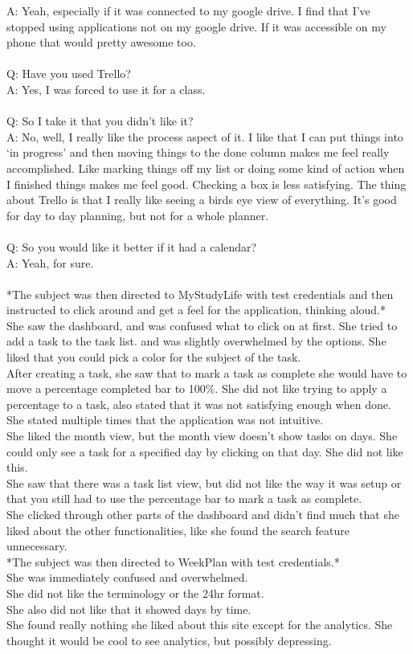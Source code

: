 A: Yeah, especially if it was connected to my google drive. I find that I’ve stopped using applications not on my google drive. If it was accessible on my phone that would pretty awesome too.\\ \\
Q: Have you used Trello? \\
A: Yes, I was forced to use it for a class.\\ \\
Q: So I take it that you didn't like it? \\
A: No, well, I really like the process aspect of it. I like that I can put things into ‘in progress’ and then moving things to the done column makes me feel really accomplished. Like marking things off my list or doing some kind of action when I finished things makes me feel good. Checking a box is less satisfying. The thing about Trello is that I really like seeing a birds eye view of everything. It’s good for day to day planning, but not for a whole planner. \\ \\
Q: So you would like it better if it had a calendar? \\
A: Yeah, for sure.\\ \\
*The subject was then directed to MyStudyLife with test credentials and then instructed to click around and get a feel for the application, thinking aloud.*\\
She saw the dashboard, and was confused what to click on at first. She tried to add a task to the task list. and was slightly overwhelmed by the options. She liked that you could pick a color for the subject of the task. \\
After creating a task, she saw that to mark a task as complete she would have to move a percentage completed bar to 100\%. She did not like trying to apply a percentage to a task, also stated that it was not satisfying enough when done.\\
She stated multiple times that the application was not intuitive.\\
She liked the month view, but the month view doesn’t show tasks on days. She could only see a task for a specified day by clicking on that day. She did not like this.\\
She saw that there was a task list view, but did not like the way it was setup or that you still had to use the percentage bar to mark a task as complete.\\
She clicked through other parts of the dashboard and didn’t find much that she liked about the other functionalities, like she found the search feature unnecessary.
\\ *The subject was then directed to WeekPlan with test credentials.*\\
She was immediately confused and overwhelmed.\\
She did not like the terminology or the 24hr format.\\
She also did not like that it showed days by time.\\
She found really nothing she liked about this site except for the analytics. She thought it would be cool to see analytics, but possibly depressing.\\

